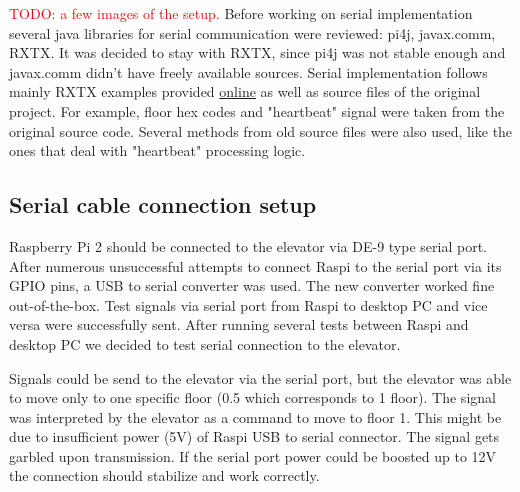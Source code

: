 \documentclass[a4paper, 12pt]{article}
\newcommand\todo[1]{\textcolor{red}{#1}}
\begin{document}
\todo{TODO: a few images of the setup.}
Before working on serial implementation several java libraries for serial communication were reviewed: pi4j, javax.comm, RXTX.
It was decided to stay with RXTX, since pi4j was not stable enough and javax.comm didn't have freely available sources.
Serial implementation follows mainly RXTX examples provided \href{http://rxtx.qbang.org/wiki/index.php/Two_way_communcation_with_the_serial_port}{online} as well as source files of the original project.
For example, floor hex codes and "heartbeat" signal were taken from the original source code.
Several methods from old source files were also used, like the ones that deal with "heartbeat" processing logic.

\subsection{Serial cable connection setup}
\label{sec:Serial_cable_connection_setup}
Raspberry Pi 2 should be connected to the elevator via DE-9 type serial port.
After numerous unsuccessful attempts to connect Raspi to the serial port via its GPIO pins, a USB to serial converter was used. 
The new converter worked fine out-of-the-box.
Test signals via serial port from Raspi to desktop PC and vice versa were successfully sent.
After running several tests between Raspi and desktop PC we decided to test serial connection to the elevator.

Signals could be send to the elevator via the serial port, but the elevator was able to move only to one specific floor (0.5 which corresponds to 1 floor).
The signal was interpreted by the elevator as a command to move to floor 1.
This might be due to insufficient power (5V) of Raspi USB to serial connector.
The signal gets garbled upon transmission.
If the serial port power could be boosted up to 12V the connection should stabilize and work correctly. 
\end{document}
